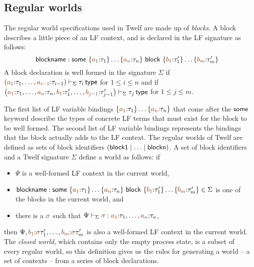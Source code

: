 \subsection{Regular worlds}
\label{sec:gen-regularworlds}

The
regular world specifications used in Twelf
\cite{schurmann00automating} are made up of {\it blocks}. A block
describes a little piece of an LF context, and is declared in the LF
signature as follows:
\[
 {\sf blockname} :
 {\sf some}~\{\lf{a_1}{:}\tau_1\}\ldots\{\lf{a_n}{:}\tau_n\}
~{\sf block}~\{\lf{b_1}{:}\tau'_1\}\ldots\{\lf{b_m}{:}\tau'_m\}
\]
A block declaration is well formed in the signature $\Sigma$ if 
$\left(\lf{a_1}{:}\tau_1,\ldots,\lf{a_{i-1}}{:} \tau_{i-1} \right)\vdash_\Sigma
\tau_i \,{\sf type}$ for $1 \leq i \leq n$ and if 
$\left(\lf{a_1}{:}\tau_1,\ldots,\lf{a_{n}}{:} \tau_{n},
 \lf{b_1}{:}\tau'_1,\ldots,\lf{b_{j-1}}{:}\tau'_{j-1}\right) \vdash_\Sigma
\tau_j \,{\sf type}$ for $1 \leq j \leq m$. 

The first list of LF variable bindings
$\{\lf{a_1}{:}\tau_1\}\ldots\{\lf{a_n}{:}\tau_n\}$ that 
come after the ${\sf some}$ keyword describe the types
of concrete LF terms that must exist for the block to be well formed.
The second list of LF variable bindings represents the bindings that
the block actually adds to the LF context. The regular worlds of 
Twelf are defined as sets of block identifiers 
$({\sf block1} \mid \ldots \mid {\sf blockn})$. A set of block identifiers
and a Twelf signature $\Sigma$ define a world as follows: if
\smallskip
\begin{itemize}
\item $\Psi$ is a well-formed
LF context in the current world, 
\item ${\sf blockname} :
 {\sf some}~\{\lf{a_1}{:}\tau_1\}\ldots\{\lf{a_n}{:}\tau_n\}
~{\sf block}~\{\lf{b_1}{:}\tau'_1\}\ldots\{\lf{b_m}{:}\tau'_m\} \in \Sigma$
 is one of the blocks in the current world, and
\item there is a $\lf{\sigma}$ such that
$\Psi \vdash_\Sigma \lf{\sigma} :
\lf{a_1}{:}\tau_1,\ldots,\lf{a_n}{:}\tau_n$, 
\end{itemize}
\smallskip then $\Psi, \lf{b_1}{:}\lf\sigma\tau'_1,\ldots,
\lf{b_m}{:}\lf\sigma\tau'_m$ is also a well-formed LF context in the
current world. The {\it closed world}, which contains only the empty
process state, is a subset of every regular world, so this definition
gives us the rules for generating a world -- a set of contexts -- from
a series of block declarations.

